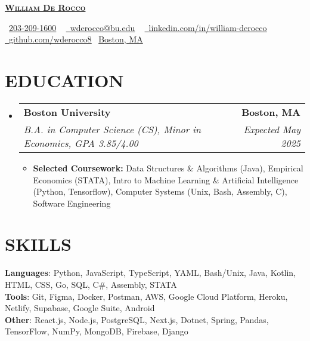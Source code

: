 \documentclass[letterpaper,11pt]{article}
\makeatletter
\newcommand{\resumeItem}[1]{
  \item\small{
    {#1 \vspace{-3pt}}
  }
}
\newcommand{\resumeSubheading}[4]{
  \vspace{-3pt}\item
    \begin{tabular*}{1.0\textwidth}[t]{l@{\extracolsep{\fill}}r}
      \textbf{#1} & \textbf{\small #2} \\
      \textit{\small#3} & \textit{\small #4} \\
    \end{tabular*}\vspace{-7pt}
}
\newcommand{\resumeSubHeadingListStart}{\begin{itemize}[leftmargin=0.0in, label={}]}
\newcommand{\resumeSubHeadingListEnd}{\end{itemize}}
\newcommand{\resumeItemListStart}{\begin{itemize}}
\newcommand{\resumeItemListEnd}
{\end{itemize}\vspace{0pt}}
\makeatother
\begin{document}
    \begin{center}
        {\huge \scshape \textbf{\href{https://william-derocco.netlify.app/}{William De Rocco }}}
        
        \small
        \raisebox{-0.2\height}\faPhone\  \underline{203-209-1600} ~ 
        \href{mailto:wderocco@bu.edu}{\raisebox{-0.2\height}\faEnvelope\  \underline{wderocco@bu.edu}} ~ 
        \href{https://www.linkedin.com/in/william-derocco/}{\raisebox{-0.2\height}\faLinkedin\ \underline{linkedin.com/in/william-derocco}}  ~
        \href{https://www.github.com/wderocco8}{\raisebox{-0.2\height}\faGithub\ \underline{github.com/wderocco8}}
        \raisebox{-0.2\height}\faMapPin \ \underline{Boston, MA}
    \end{center}

\section{EDUCATION}
  \resumeSubHeadingListStart
  
    \resumeSubheading
    {Boston University}{Boston, MA}
    {B.A.  in Computer Science (CS), Minor in Economics, GPA 3.85/4.00}{Expected May 2025}
        \resumeItemListStart
            \resumeItem{\textbf{Selected Coursework:} Data Structures \& Algorithms (Java), Empirical Economics (STATA), Intro to Machine Learning \& Artificial Intelligence (Python, Tensorflow), Computer Systems (Unix, Bash, Assembly, C), Software Engineering}
        \resumeItemListEnd
        
  \resumeSubHeadingListEnd

\section{SKILLS}

    \vspace{-7pt}
    \begin{itemize}
    [leftmargin=0.15in, label={}]\small{\item{
        \textbf{Languages}{: Python, JavaScript, TypeScript, YAML, Bash/Unix, Java, Kotlin, HTML, CSS, Go, SQL, C\#, Assembly, STATA} \\
        \textbf{Tools}{: Git, Figma, Docker, Postman, AWS, Google Cloud Platform, Heroku, Netlify, Supabase, Google Suite, Android} \\
        \textbf{Other}{: React.js, Node.js, PostgreSQL, Next.js, Dotnet, Spring, Pandas, TensorFlow, NumPy, MongoDB, Firebase, Django} \\}}
    \end{itemize}
\end{document}
